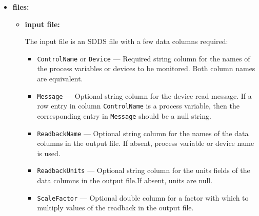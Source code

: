 \begin{itemize}
\begin{verbatim}
  [-oncaerror={usezero|skiprow|exit}] [-pendIOtime=<value>] [-ezcaTiming[=<timeout>,<retries>]] [-noezca]
  [-glitch=<controlname>[,message=<string>]{,delta=<value>|,fraction=<value>}[,before=<number>][,after=<number>][,{baseline=<number>|filterFraction=<value>}][,sign={+|-}][,noReset][,{autoHoldoff|holdoff=<seconds>}]]
  [-trigger=<controlName>,level=<value>[,message=<string>][,slope={+|-}][,before=<number>][,after=<number>][,autoArm][,{autoHoldoff|holdoff=<seconds>}]]
  [-alarmTrigger=<controlName>[,status=<statusNames>][,notStatus=<statusNames>][,severity=<sevNames>][,notSeverity=<sevNames>][,{autoHoldoff|holdoff=<seconds>}]]
  [-circularBuffer=[before=<number>,][after=<number>]] [-holdoffTime=<seconds>] [-autoHoldoff]
  [-conditions=<filename>,{allMustPass|oneMustPass}[,touchOutput][,retakeStep]]
  [-comment=<parameterName>,<text>] [-getUnits={force|ifBlank|ifNoneGiven}]
  [-inhibitPV=name=<name>[,pendIOTime=<seconds>][,waitTime=<seconds>]]
  [-stopPV=<controlName>[,pendIOTime=<seconds>]]
  [-runControlPV=string=<string>,pingTimeout=<value>]
  [-runControlDescription=string=<string>]
\end{verbatim}
\item {\bf files:}
\begin{itemize}
\item {\bf input file:}\par
The input file is an SDDS file with a few data columns required:
\begin{itemize}
        \item {\tt ControlName} or {\tt Device} --- Required string column for the names of the process variables
                or devices to be monitored. Both column names are equivalent.
        \item {\tt Message} --- Optional string column for the device read message. If a row entry in
                column {\tt ControlName} is a process variable, then the corresponding entry
                in {\tt Message} should be a null string. 
        \item {\tt ReadbackName} --- Optional string column for the names of the data columns in the 
                output file. If absent, process variable or device name is used.
        \item {\tt ReadbackUnits} --- Optional string column for the units fields of the data columns in the 
                output file.If absent, units are null.
        \item {\tt ScaleFactor} --- Optional double column for a factor with which to multiply
                values of the readback in the output file.
\end{itemize}


\end{itemize}
\end{itemize}
